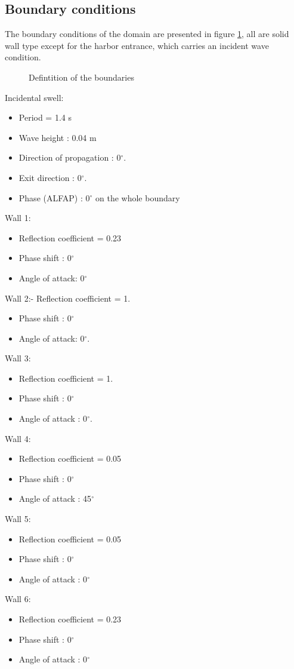 \subsection{Boundary conditions}

The boundary conditions of the domain are presented in figure \ref{fig:port_bc},
all are solid wall type except for the harbor entrance, which carries an incident wave condition.

\begin{figure}[h]
\begin{center}
\end{center}
\caption{ Defintition of the boundaries}
\label{fig:port_bc}
\end{figure}


Incidental swell:
\begin{itemize}
\item Period = 1.4 s
\item Wave height : 0.04 m
\item Direction of propagation : 0$^\circ$.
\item Exit direction : 0$^\circ$.
\item Phase (ALFAP) : 0$^\circ$ on the whole boundary
\end{itemize}
Wall 1:
\begin{itemize}
\item Reflection coefficient = 0.23
\item Phase shift : 0$^\circ$
\item Angle of attack: 0$^\circ$
\end{itemize}
Wall 2:- Reflection coefficient = 1.
\begin{itemize}
\item Phase shift : 0$^\circ$
\item Angle of attack: 0$^\circ$.
\end{itemize}
Wall 3:
\begin{itemize}
\item Reflection coefficient = 1.
\item Phase shift : 0$^\circ$
\item Angle of attack : 0$^\circ$.
\end{itemize}
Wall 4:
\begin{itemize}
\item Reflection coefficient = 0.05
\item Phase shift : 0$^\circ$
\item Angle of attack : 45$^\circ$
\end{itemize}
Wall 5:
\begin{itemize}
\item Reflection coefficient = 0.05
\item Phase shift : 0$^\circ$
\item Angle of attack : 0$^\circ$
\end{itemize}
Wall 6:
\begin{itemize}
\item Reflection coefficient = 0.23
\item Phase shift : 0$^\circ$
\item Angle of attack : 0$^\circ$
\end{itemize}

